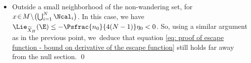\begin{itemize}
\[
\Lie_{X_H} (G_m) = \Lie_{\widetilde{X}_H} (\E) \log \w{ |\xi| C_1} + C_2.
\]
Moreover, according to the construction of $\E$, one can find a positive constant $\eta > 0$ such that $ \Lie_{\widetilde{X}_H} (\E) (x,\tilde{\xi}) < - \eta < 0$. Therefore, there exists a positive radius $R > 0$ such that, for every $(x,\xi)$ in the set $T^*M \setminus \left(\Cone (\Ncal^\rs) \cup \Cone (\Ncal^\ro) \cup \Cone (\Ncal^\ru) \right)$ with $x \in \bigcup_{1 \leq i \leq N} \Ncal_i$ and $|\xi| \geq R$, we~have
\begin{equation}\label{eq: proof of escape function - bound on derivative of the escape function}
\Lie_{X_H} (G_m) \leq - \gamma \min(s, |u|).
\end{equation}
Therefore, we~define $C_m:= \gamma \min(s, |u|) $.
\item Outside a small neighborhood of the non-wandering set, \ie for $x \!\in\! M\!\setminus\! \bigl(\bigcup_{i = 1}^N \Ncal_i \bigr)$. In this case, we have $ \Lie_{\widetilde{X}_H} (\E) \leq - \Psfrac{n_0}{4 (N-1)}\eta_0 < 0$. So, using a similar argument as in the previous point, we~deduce that equation \eqref{eq: proof of escape function - bound on derivative of the escape function} still holds far away from the null section. \qed
\end{itemize}

